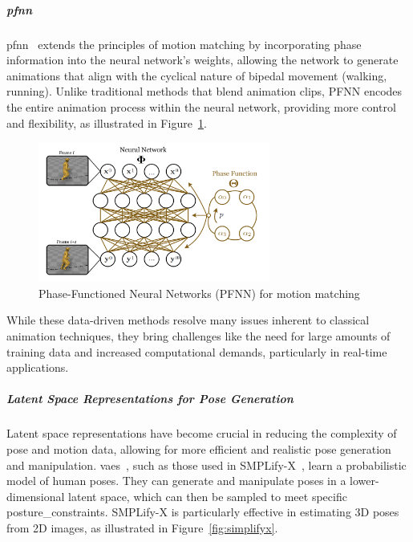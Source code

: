 \documentclass[../../main.tex]{subfiles}
\begin{document}
\subparagraph{\gls{pfnn}}
\label{ch:background_work:sign_language_synthesis:3d_techniques:avatar_animation:deep_learning:pfnn}

\gls{pfnn}~\cite{10.1145/3072959.3073663} extends the principles of motion matching by incorporating phase information into the neural network’s weights, allowing the network to generate animations that align with the cyclical nature of bipedal movement (walking, running). Unlike traditional methods that blend animation clips, PFNN encodes the entire animation process within the neural network, providing more control and flexibility, as illustrated in Figure~\ref{fig:pfnn}.

\begin{figure}
  \centering \includegraphics[width = 3in]{chapters/background_work/images/pfnn.png}
  \caption{Phase-Functioned Neural Networks (PFNN) for motion matching}
  \label{fig:pfnn}
\end{figure}

While these data-driven methods resolve many issues inherent to classical animation techniques, they bring challenges like the need for large amounts of training data and increased computational demands, particularly in real-time applications.

\subparagraph{Latent Space Representations for Pose Generation}
\label{ch:background_work:sign_language_synthesis:3d_techniques:avatar_animation:deep_learning:latent_space}

Latent space representations have become crucial in reducing the complexity of pose and motion data, allowing for more efficient and realistic pose generation and manipulation. \gls{vae}s~\cite{kingma2013auto}, such as those used in SMPLify-X~\cite{pavlakos2019expressive}, learn a probabilistic model of human poses. They can generate and manipulate poses in a lower-dimensional latent space, which can then be sampled to meet specific \gls{posture_constraint}s. SMPLify-X is particularly effective in estimating 3D poses from 2D images, as illustrated in Figure~\ref{fig:simplifyx}.
\end{document}
